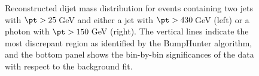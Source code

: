 \begin{figure}[ht!]
	\centering
	\hspace{0.1\textwidth}%
	\caption{Reconstructed dijet mass distribution for events containing two jets with $\pt > 25$\,GeV and either a jet with $\pt > 430$\,GeV (left) or a photon with $\pt > 150$\,GeV (right).  The vertical lines indicate the most discrepant region as identified by the BumpHunter algorithm, and the bottom panel shows the bin-by-bin significances of the data with respect to the background fit.}
	\label{fig:ISR_Resolved}
\end{figure}

